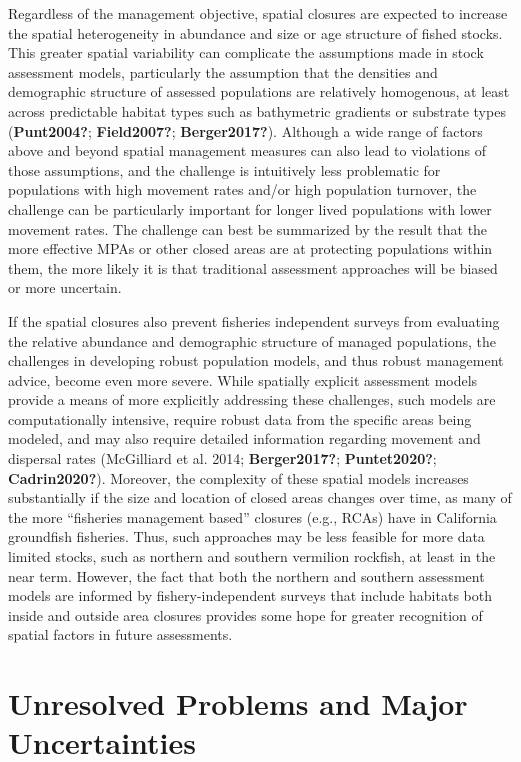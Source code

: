 \documentclass[
  english,
  a4paper,
]{article}
\begin{document}
Regardless of the management objective, spatial closures are expected to increase the spatial heterogeneity in abundance and size or age structure of fished stocks. This greater spatial variability can complicate the assumptions made in stock assessment models, particularly the assumption that the densities and demographic structure of assessed populations are relatively homogenous, at least across predictable habitat types such as bathymetric gradients or substrate types (\textbf{Punt2004?}; \textbf{Field2007?}; \textbf{Berger2017?}). Although a wide range of factors above and beyond spatial management measures can also lead to violations of those assumptions, and the challenge is intuitively less problematic for populations with high movement rates and/or high population turnover, the challenge can be particularly important for longer lived populations with lower movement rates. The challenge can best be summarized by the result that the more effective MPAs or other closed areas are at protecting populations within them, the more likely it is that traditional assessment approaches will be biased or more uncertain.

If the spatial closures also prevent fisheries independent surveys from evaluating the relative abundance and demographic structure of managed populations, the challenges in developing robust population models, and thus robust management advice, become even more severe. While spatially explicit assessment models provide a means of more explicitly addressing these challenges, such models are computationally intensive, require robust data from the specific areas being modeled, and may also require detailed information regarding movement and dispersal rates (McGilliard et al. 2014; \textbf{Berger2017?}; \textbf{Puntet2020?}; \textbf{Cadrin2020?}). Moreover, the complexity of these spatial models increases substantially if the size and location of closed areas changes over time, as many of the more ``fisheries management based'' closures (e.g., RCAs) have in California groundfish fisheries. Thus, such approaches may be less feasible for more data limited stocks, such as northern and southern vermilion rockfish, at least in the near term. However, the fact that both the northern and southern assessment models are informed by fishery-independent surveys that include habitats both inside and outside area closures provides some hope for greater recognition of spatial factors in future assessments.

\hypertarget{unresolved-problems-and-major-uncertainties-2}{%
\section{Unresolved Problems and Major Uncertainties}\label{unresolved-problems-and-major-uncertainties-2}}
\end{document}
